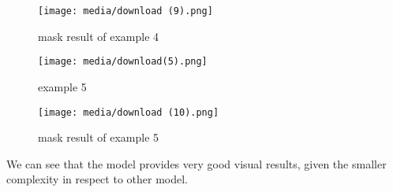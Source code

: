 \begin{figure}[H]
    \centering
    \texttt{[image: media/download (9).png]}
    \caption{mask result of example 4}
    \label{fig:enter-label}
\end{figure}

\begin{figure}[H]
    \centering
    \texttt{[image: media/download(5).png]}
    \caption{example 5}
    \label{fig:enter-label}
\end{figure}

\begin{figure}[H]
    \centering
    \texttt{[image: media/download (10).png]}
    \caption{mask result of example 5}
    \label{fig:enter-label}
\end{figure}

We can see that the model provides very good visual results, given the smaller complexity in respect to other model.  